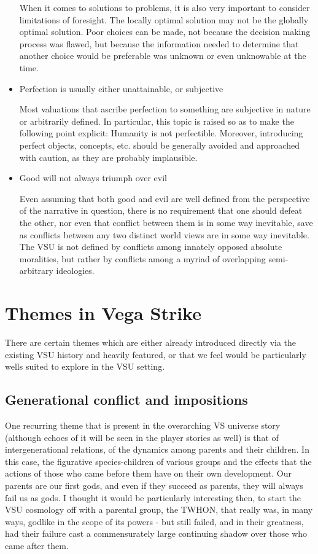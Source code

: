 \begin{itemize}
When it comes to solutions to problems, it is also very important to
consider limitations of foresight. The locally optimal solution may
not be the globally optimal solution. Poor choices can be made, not
because the decision making process was flawed, but because the
information needed to determine that another choice would be
preferable was unknown or even unknowable at the time.

\item Perfection is usually either unattainable, or subjective

Most valuations that ascribe perfection to something are subjective in
nature or arbitrarily defined. In particular, this topic is raised so
as to make the following point explicit: Humanity is not
perfectible. Moreover, introducing perfect objects, concepts,
etc. should be generally avoided and approached with caution, as they
are probably implausible.

\item Good will not always triumph over evil

Even assuming that both good and evil are well defined from the
perspective of the narrative in question, there is no requirement that
one should defeat the other, nor even that conflict between them is in
some way inevitable, save as conflicts between any two distinct world
views are in some way inevitable. The VSU is not defined by conflicts
among innately opposed absolute moralities, but rather by conflicts
among a myriad of overlapping semi-arbitrary ideologies.

\end{itemize}


\section{Themes in Vega Strike}
\label{sec:VSthemes}
There are certain themes which are either already introduced directly
via the existing VSU history and heavily featured, or that we feel
would be particularly wells suited to explore in the VSU setting.

\subsection{Generational conflict and impositions}
One recurring theme that is present in the overarching VS universe
story (although echoes of it will be seen in the player stories as
well) is that of intergenerational relations, of the dynamics among parents and their
children. In this case, the figurative species-children of various
groups and the effects that the actions of those who came before them
have on their own development. Our parents are our first gods, and
even if they succeed as parents, they will always fail us as gods. I
thought it would be particularly interesting then, to start the VSU
cosmology off with a parental group, the TWHON, that really was, in
many ways, godlike in the scope of its powers - but still failed, and
in their greatness, had their failure cast a commensurately large
continuing shadow over those who came after them.


